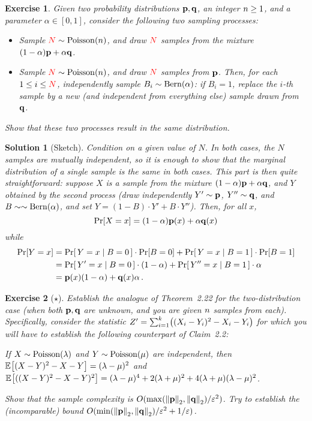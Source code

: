 \documentclass[biber,plain]{nowfnt} %
\newtheorem{question}{Exercise}[chapter]
\newtheorem{solution}{Solution}[chapter]
\newcommand{\occur}{\textcolor{red}{N}}
\newcommand{\occur}{N}
\begin{document}
\begin{question}\label{ex:mixture:sample}
Given two probability distributions $\mathbf{p},\mathbf{q}$, an integer $n\geq 1$, and a parameter $\alpha\in[0,1]$, consider the following two sampling processes:
\begin{itemize}
  \item Sample $\occur \sim \poisson{\ns}$, and draw $\occur$ \iid samples from the mixture $(1-\alpha)\mathbf{p}+\alpha\mathbf{q}$.
  \item Sample $\occur \sim \poisson{\ns}$, and draw $\occur$ \iid samples from $\mathbf{p}$. Then, for each $1\leq i\leq \occur$, independently sample $B_i\sim\operatorname{Bern}( \alpha ) $: if $B_i=1$, replace the $i$-th sample by a new (and independent from everything else) sample drawn from $\mathbf{q}$.
\end{itemize}
Show that these two processes result in the same distribution.
\end{question}
\begin{solution}[Sketch]
Condition on a given value of $N$. In both cases, the $N$ samples are mutually independent, so it is enough to show that the marginal distribution of a single sample is the same in both cases. This part is then quite straightforward: suppose $X$ is a sample from the mixture $(1-\alpha)\mathbf{p}+\alpha\mathbf{q}$, and $Y$ obtained by the second process (draw independently $Y'\sim\mathbf{p}$, $Y''\sim \mathbf{q}$, and $B\sim\sim\operatorname{Bern}( \alpha ) $, and set $Y=(1-B)\cdot Y'+B\cdot Y''$). Then, for all $x$,
\[
	\bPr{X=x} =  (1-\alpha)\p(x)+\alpha\q(x)
\] 
while
\begin{align*}
	\bPr{Y=x} 
	&=  \probaCond{Y=x}{B=0}\cdot \bPr{B=0} + \probaCond{Y=x}{B=1}\cdot \bPr{B=1} \\
	&= \probaCond{Y'=x}{B=0}\cdot (1-\alpha) + \probaCond{Y''=x}{B=1}\cdot \alpha \\
	&=  \p(x)(1-\alpha)+\q(x)\alpha\,.
\end{align*}
\end{solution}
\begin{question}[$\star$]\label{ex:l2:closeness}
Establish the analogue of Theorem~2.22 for the \emph{two-distribution} case (when both $\mathbf{p},\mathbf{q}$ are unknown, and you are given $n$ \iid samples from each). Specifically, consider the statistic
$Z'=\sum_{i=1}^\ab \Paren{(X_i-Y_i)^2-X_i-Y_i}$
for which you will have to establish the following counterpart of Claim~2.2:
\begin{claim}
	\label{claim:closeness:moments:poisson}
If $X\sim\poisson{\lambda}$ and $Y\sim\poisson{\mu}$ are independent, then 
  $
  \bEE{(X-Y)^2-X-Y} = (\lambda-\mu)^2
  $
  and 
  $
  \bEE{((X-Y)^2-X-Y)^2} = (\lambda-\mu)^4 + 2(\lambda+\mu)^2 + 4(\lambda+\mu)(\lambda-\mu)^2
  $.
\end{claim}
\noindent Show that the sample complexity is $O(\max\Paren{\normtwo{\p},\normtwo{\q}}/\dst^2)$. Try to establish the (incomparable) bound $O(\min\Paren{\normtwo{\p},\normtwo{\q}}/\dst^2+1/\dst)$.
\end{question}
\end{document}
